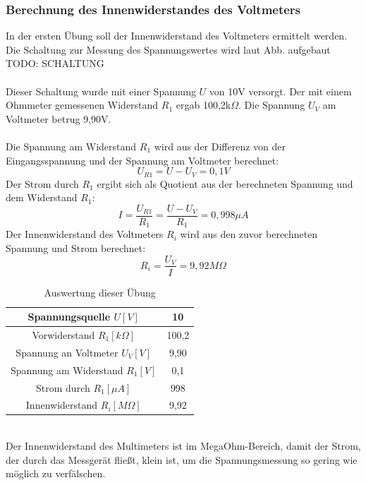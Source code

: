 \subsubsection{Berechnung des Innenwiderstandes des Voltmeters}
In der ersten Übung soll der Innenwiderstand des Voltmeters ermittelt werden. Die Schaltung zur Messung des Spannungswertes wird laut Abb. aufgebaut
~\\
TODO: SCHALTUNG		\\
~\\
Dieser Schaltung wurde mit einer Spannung $U$ von 10V versorgt. Der mit einem Ohmmeter gemessenen Widerstand $R_1$ ergab 100,2k$\Omega$. Die Spannung $U_V$ am Voltmeter betrug 9,90V.	\\
~\\
Die Spannung am Widerstand $R_1$ wird aus der Differenz von der Eingangsspannung und der Spannung am Voltmeter berechnet: 
\begin{equation}
	U_{R1} = U - U_V = 0,1V
	\label{eq:1}
\end{equation}
Der Strom durch $R_1$ ergibt sich als Quotient aus der berechneten Spannung und dem Widerstand $R_1$:
\begin{equation}
	I = \dfrac{U_{R1}}{R_1} = \dfrac{U - U_V}{R_1} = 0,998\mu A
\end{equation}
Der Innenwiderstand des Voltmeters $R_i$ wird aus den zuvor berechneten Spannung und Strom berechnet:
\begin{equation}
	R_i = \dfrac{U_V}{I} = 9,92M\Omega
\end{equation}
\begin{table}[h]
	\centering
	\begin{tabular}{|c|c|}
	\hline 
	Spannungsquelle $U [V]$			& 10 		\\ 
	\hline 
	Vorwiderstand $R_1 [k\Omega]$		& 100,2	\\ 
	\hline 
	Spannung an Voltmeter $U_V [V]$ 	& 9,90	\\ 
	\hline 
	Spannung am Widerstand $R_1 [V]$	& 0,1		\\ 
	\hline 
	Strom durch $R_1 [\mu A]$		& 998		\\ 
	\hline 
	Innenwiderstand $R_i [M\Omega]$	& 9,92	\\ 
	\hline 
	\end{tabular}
	\caption{Auswertung dieser Übung}
\end{table}
~\\
Der Innenwiderstand des Multimeters ist im MegaOhm-Bereich, damit der Strom, der durch das Messgerät fließt, klein ist, um die Spannungsmessung so gering wie möglich zu verfälschen.


